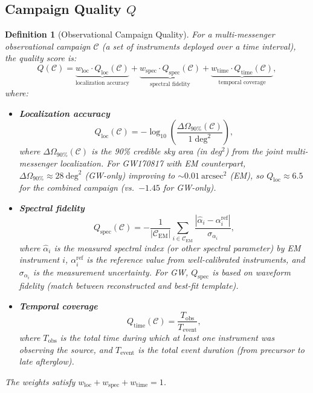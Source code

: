 \documentclass[11pt,a4paper]{article}
\newtheorem{definition}[theorem]{Definition}
\theoremstyle{definition}
\begin{document}
\subsection{Campaign Quality $Q$}
\begin{definition}[Observational Campaign Quality]\label{def:Q_astro}
For a multi-messenger observational campaign $\mathcal{C}$ (a set of instruments deployed over a time interval), the quality score is:
\begin{equation}\label{eq:Q_astro}
Q(\mathcal{C}) = \underbrace{w_{\mathrm{loc}} \cdot Q_{\mathrm{loc}}(\mathcal{C})}_{\text{localization accuracy}} + \underbrace{w_{\mathrm{spec}} \cdot Q_{\mathrm{spec}}(\mathcal{C})}_{\text{spectral fidelity}} + \underbrace{w_{\mathrm{time}} \cdot Q_{\mathrm{time}}(\mathcal{C})}_{\text{temporal coverage}},
\end{equation}
where:
\begin{itemize}
    \item \textbf{Localization accuracy}
    \begin{equation}\label{eq:Q_loc}
    Q_{\mathrm{loc}}(\mathcal{C}) = -\log_{10}\!\left(\frac{\Delta\Omega_{90\%}(\mathcal{C})}{1\;\mathrm{deg}^2}\right),
    \end{equation}
    where $\Delta\Omega_{90\%}(\mathcal{C})$ is the 90\% credible sky area (in deg$^2$) from the joint multi-messenger localization. For GW170817 with EM counterpart, $\Delta\Omega_{90\%} \approx 28~\mathrm{deg}^2$ (GW-only) improving to $\sim 0.01~\mathrm{arcsec}^2$ (EM), so $Q_{\mathrm{loc}} \approx 6.5$ for the combined campaign (vs.\ $-1.45$ for GW-only).
    \item \textbf{Spectral fidelity}
    \begin{equation}\label{eq:Q_spec}
    Q_{\mathrm{spec}}(\mathcal{C}) = -\frac{1}{|\mathcal{C}_{\mathrm{EM}}|}\sum_{i \in \mathcal{C}_{\mathrm{EM}}} \frac{|\hat{\alpha}_i - \alpha_i^{\mathrm{ref}}|}{\sigma_{\alpha_i}},
    \end{equation}
    where $\hat{\alpha}_i$ is the measured spectral index (or other spectral parameter) by EM instrument $i$, $\alpha_i^{\mathrm{ref}}$ is the reference value from well-calibrated instruments, and $\sigma_{\alpha_i}$ is the measurement uncertainty. For GW, $Q_{\mathrm{spec}}$ is based on waveform fidelity (match between reconstructed and best-fit template).
    \item \textbf{Temporal coverage}
    \begin{equation}\label{eq:Q_time}
    Q_{\mathrm{time}}(\mathcal{C}) = \frac{T_{\mathrm{obs}}}{T_{\mathrm{event}}},
    \end{equation}
    where $T_{\mathrm{obs}}$ is the total time during which at least one instrument was observing the source, and $T_{\mathrm{event}}$ is the total event duration (from precursor to late afterglow).
\end{itemize}
The weights satisfy $w_{\mathrm{loc}} + w_{\mathrm{spec}} + w_{\mathrm{time}} = 1$.
\end{definition}
\end{document}
